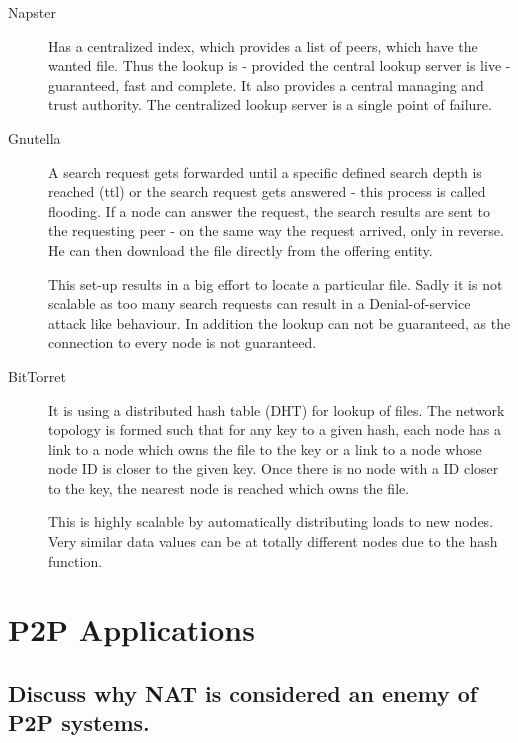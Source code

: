 \documentclass{article}
\begin{document}
\begin{description}

  \item[Napster]

  Has a centralized index, which provides a list of peers, which have the wanted
  file. Thus the lookup is - provided the central lookup server is live -
  guaranteed, fast and complete. It also provides a central managing and trust
  authority. The centralized lookup server is a single point of failure.

  \item[Gnutella]

  A search request gets forwarded until a specific defined search depth is
  reached (ttl) or the search request gets answered - this process is called
  flooding. If a node can answer the request, the search results are sent to the
  requesting peer - on the same way the request arrived, only in reverse. He can
  then download the file directly from the offering entity.

  This set-up results in a big effort to locate a particular file. Sadly it is
  not scalable as too many search requests can result in a Denial-of-service
  attack like behaviour. In addition the lookup can not be guaranteed, as the
  connection to every node is not guaranteed.

  \item[BitTorret]

  It is using a distributed hash table (DHT) for lookup of files. The network
  topology is formed such that for any key to a given hash, each node has a link
  to a node which owns the file to the key or a link to a node whose node ID is
  closer to the given key. Once there is no node with a ID closer to the key,
  the nearest node is reached which owns the file.

  This is highly scalable by automatically distributing loads to new nodes. Very
  similar data values can be at totally different nodes due to the hash
  function.

\end{description}

\section{P2P Applications}

\subsection{Discuss why NAT is considered an enemy of P2P systems.}
\end{document}
